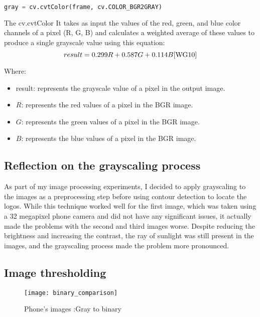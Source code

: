 \FloatBarrier 
\begin{lstlisting}[language=Python]
 gray = cv.cvtColor(frame, cv.COLOR_BGR2GRAY)
\end{lstlisting}
The cv.cvtColor It takes as input the values of the red, green, and blue color channels of a pixel (R, G, B) and calculates a weighted average of these values to produce a single grayscale value using this equation:\cite{WG10}
\begin{equation}
result = 0.299 R + 0.587 G + 0.114 B \cite{WG10}
\end{equation}

Where:

\begin{itemize}
\item result: represents the grayscale value of a pixel in the output image.
\item $R$: represents the red values of a pixel in the BGR image.
\item $G$: represents the green values of a pixel in the BGR image.
\item $B$: represents the blue values of a pixel in the BGR image.
\end{itemize}

\subsection{Reflection on the grayscaling process}
As part of my image processing experiments, I decided to apply grayscaling to the images as a preprocessing step before using contour detection to locate the logos. While this technique worked well for the first image, which was taken using a 32 megapixel phone camera and did not have any significant issues, it actually made the problems with the second and third images worse. Despite reducing the brightness and increasing the contrast, the ray of sunlight was still present in the images, and the grayscaling process made the problem more pronounced.
\subsection{Image thresholding}

\FloatBarrier
\begin{figure}[h]
\FloatBarrier
         \centering
        \texttt{[image: binary\_comparison]}
   
        \caption{Phone's images :Gray to binary}
        \label{fig:Phone's images : Gray to binary}
\FloatBarrier
    \end{figure}


